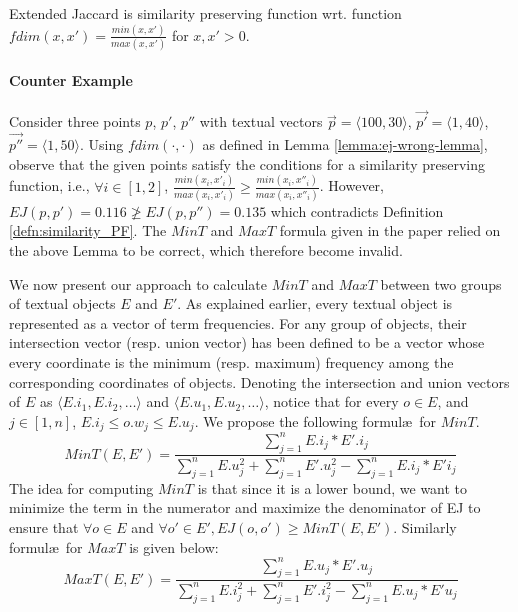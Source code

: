 \documentclass[prodmode,letterpaper]{acmsmall}
\begin{document}
\begin{lemma}\cite{lu2011reverse}
    \label{lemma:ej-wrong-lemma}
    Extended Jaccard is similarity preserving function wrt. function $fdim(x,x') =\frac{min (x,x')}{max(x,x')}$ for $x,x'> 0$.
\end{lemma}


\paragraph{Counter Example}
Consider three points $p$, $p'$, $p''$ with textual vectors $\vec{p}= \langle 100,30 \rangle$, $\vec{p'}= \langle 1,40 \rangle$, $\vec{p''}= \langle 1,50 \rangle$.
Using $fdim(\cdot,\cdot)$ as defined in Lemma \ref{lemma:ej-wrong-lemma},
observe that the given points satisfy 
the conditions for a similarity preserving
function, i.e., $\forall i \in [1,2]$, $\frac{min(x_i,x'_i)}{max(x_i,x'_i)} \ge
\frac{min(x_i,x''_i)}{max(x_i,x''_i)}$. 
However, $EJ(p,p') = 0.116 \not\geq EJ(p,p'') = 0.135 $ which contradicts Definition
\ref{defn:similarity_PF}. The $MinT$ and $MaxT$ formula given in the paper relied
on the above Lemma to be correct, which therefore become invalid.


We now present our approach to calculate $MinT$ and $MaxT$ between two groups of
textual objects $E$ and $E'$.
As explained earlier, every textual object is represented as a vector of term
frequencies. For any group of objects, their intersection vector (resp. union
vector) has been defined to be a vector whose every coordinate is the minimum (resp. maximum)
frequency among the corresponding coordinates of objects. Denoting the
intersection and union vectors of $E$ as $\langle E.i_1, E.i_2, \ldots \rangle$
and $\langle E.u_1, E.u_2, \ldots \rangle$, notice that for every $o \in E$, and
$j \in [1,n]$, $E.i_j \le o.w_j \le E.u_j$. 
We propose the following formul\ae\ for $MinT$.
\begin{equation}
MinT(E,E')=\frac{ \sum_{j=1}^n E.i_j*E'.i_j}{\sum_{j=1}^n E.u_j^2+\sum_{j=1}^n E'.u_j^2-\sum_{j=1}^n E.i_j*E'i_j }
\end{equation}
The idea for computing $MinT$ is that since it is a lower bound, we want to
minimize the term in the numerator and maximize the denominator of EJ to ensure
that $\forall o \in E$ and $\forall o' \in E', EJ(o,o') \geq MinT(E,E')$.
Similarly formul\ae\ for $MaxT$ is given below:
\begin{equation}
MaxT(E,E')=\frac{ \sum_{j=1}^n E.u_j*E'.u_j}{\sum_{j=1}^n E.i_j^2+\sum_{j=1}^n E'.i_j^2-\sum_{j=1}^n E.u_j*E'u_j }
\end{equation}
\end{document}
